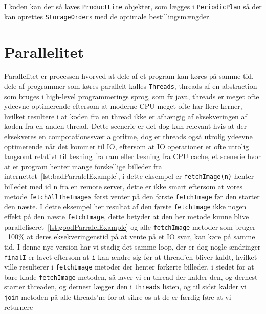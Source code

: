 I koden kan der så laves \verb|ProductLine| objekter, som lægges i \verb|PeriodicPlan| så der kan oprettes \verb|StorageOrder|s med de optimale bestillingsmængder. 

\section{Parallelitet}\label{ch:parallelitet}
Parallelitet er processen hvorved at dele af et program kan køres på samme tid, dele af programmer som køres parallelt kalles \texttt{Threads}, threads af en abstraction som bruges i high-level programmerings sprog, som fx java, threads er meget ofte ydeevne optimerende eftersom at moderne CPU meget ofte har flere kerner, hvilket resultere i at koden fra en thread ikke er afhængig af eksekveringen af koden fra en anden thread. Dette scenerie er det dog kun relevant hvis at der eksekveres en compotationssvær algoritme, dog er threads også utrolig ydeevne optimerende når det kommer til IO, eftersom at IO operationer er ofte utrolig langsomt relativt til læsning fra ram eller læsning fra CPU cache, et scenerie hvor at et program henter mange forskellige billeder fra internettet~\ref{lst:badParralelExample}, i dette eksempel er \texttt{fetchImage(n)} henter billedet med id n fra en remote server, dette er ikke smart eftersom at vores metode \texttt{fetchAllTheImages} først venter på den første \texttt{fetchImage} før den starter den næste. I dette eksempel her resultat af den første \texttt{fetchImage} ikke nogen effekt på den næste \texttt{fetchImage}, dette betyder at den her metode kunne blive paralleliseret~\ref{lst:goodParralelExample} og alle \texttt{fetchImage} metoder som bruger ~100\% at deres eksekveringenstid på at vente på et IO svar, kan køre på samme tid. I denne nye version har vi stadig det samme loop, der er dog nogle ændringer \texttt{finalI} er lavet eftersom at \texttt{i} kan ændre sig før at thread'en bliver kaldt, hvilket ville resulterer i \texttt{fetchImage} metoder der henter forkerte billeder, i stedet for at bare klade \texttt{fetchImage} metoden, så laver vi en thread der kalder den, og dernest starter threaden, og dernest lægger den i \texttt{threads} listen, og til sidst kalder vi \texttt{join} metoden på alle threads'ne for at sikre os at de er færdig føre at vi returnere


